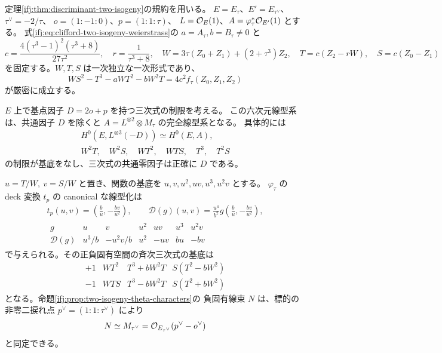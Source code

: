 \begin{proposition}
\label{ifj:prop:two-isogeny-cubic-sextet}
定理\ref{ifj:thm:discriminant-two-isogeny}の規約を用いる。
$E=E_\tau$、$E'=E_{\tau^\vee}$、$\tau^\vee=-2/\tau$、
$o=(1:-1:0)$、$p=(1:1:\tau)$、
$L=\mathcal O_E(1)$、$A=\varphi_\tau^*\mathcal O_{E'}(1)$ とする。
式\eqref{ifj:eq:clifford-two-isogeny-weierstrass}の
$a=A_\tau,b=B_\tau\ne0$ と
\[
 c=\frac{4(\tau^3-1)^2(\tau^3+8)}{27\tau^2},
 \quad r=\frac{1}{\tau^3+8},
 \quad W=3\tau(Z_0+Z_1)+(2+\tau^3)Z_2,
 \quad T=c(Z_2-rW),\quad S=c(Z_0-Z_1)
\]
を固定する。$W,T,S$ は一次独立な一次形式であり、
\begin{equation}\label{ifj:eq:cubic-sextet-weierstrass}
 W S^2-T^3-aWT^2-bW^2T=4c^2f_\tau(Z_0,Z_1,Z_2)
\end{equation}
が厳密に成立する。

$E$ 上で基点因子 $D=2o+p$ を持つ三次式の制限を考える。
この六次元線型系は、共通因子 $D$ を除くと
$A=L^{\otimes2}\otimes M_\tau$ の完全線型系となる。
具体的には
\begin{equation}\label{ifj:eq:cubic-sextet-basis}
 \begin{gathered}
 H^0(E,L^{\otimes3}(-D))\simeq H^0(E,A),\\
 W^2T,\quad W^2S,\quad WT^2,\quad WTS,\quad T^3,\quad T^2S
 \end{gathered}
\end{equation}
の制限が基底をなし、三次式の共通零因子は正確に $D$ である。

$u=T/W,\ v=S/W$ と置き、関数の基底を
$u,v,u^2,uv,u^3,u^2v$ とする。
$\varphi_\tau$ の deck 変換 $t_p$ の canonical な線型化は
\begin{equation}\label{ifj:eq:cubic-sextet-deck-matrix}
 \begin{gathered}
 t_p(u,v)=\left(\frac b u,-\frac{b v}{u^2}\right),\qquad
 \mathcal D(g)(u,v)=\frac{u^4}{b^2}
       g\left(\frac b u,-\frac{b v}{u^2}\right),\\
 \begin{array}{c|cccccc}
 g&u&v&u^2&uv&u^3&u^2v\\ \hline
 \mathcal D(g)&u^3/b&-u^2v/b&u^2&-uv&bu&-bv
 \end{array}
 \end{gathered}
\end{equation}
で与えられる。その正負固有空間の斉次三次式の基底は
\begin{equation}\label{ifj:eq:cubic-sextet-eigenspaces}
 \begin{array}{c|ccc}
 +1&WT^2&T^3+bW^2T&S(T^2-bW^2)\\
 -1&WTS&T^3-bW^2T&S(T^2+bW^2)
 \end{array}
\end{equation}
となる。命題\ref{ifj:prop:two-isogeny-theta-characters}の
負固有線束 $N$ は、標的の非零二捩れ点
$p^\vee=(1:1:\tau^\vee)$ により
\[
 N\simeq M_{\tau^\vee}
 =\mathcal O_{E_{\tau^\vee}}(p^\vee-o^\vee)
\]
と同定できる。


\end{proposition}
